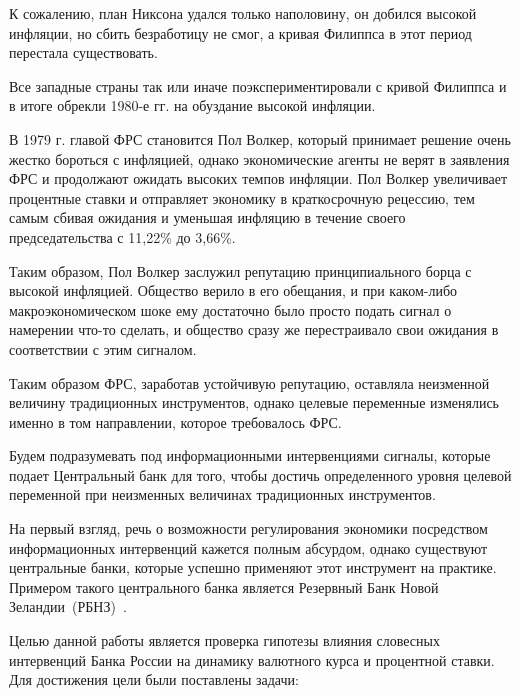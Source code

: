 \documentclass[14pt,a4paper, oneside]{extreport}
\begin{document}
К сожалению, план Никсона удался только наполовину, он добился высокой инфляции, но сбить безработицу не смог, а кривая Филиппса в этот период перестала существовать. 

Все западные страны так или иначе поэкспериментировали с кривой Филиппса и в итоге обрекли 1980-е гг. на обуздание высокой инфляции.

В 1979 г. главой ФРС становится Пол Волкер, который принимает решение очень жестко бороться с инфляцией, однако экономические агенты не верят в заявления ФРС и продолжают ожидать высоких темпов инфляции. Пол Волкер увеличивает процентные ставки и отправляет экономику в краткосрочную рецессию, тем самым сбивая ожидания и уменьшая инфляцию в течение своего председательства с 11,22\% до 3,66\%. 

Таким образом, Пол Волкер заслужил репутацию принципиального борца с высокой инфляцией. Общество верило в его обещания, и при каком-либо макроэкономическом шоке ему достаточно было просто подать сигнал о намерении что-то сделать, и общество сразу же перестраивало свои ожидания в соответствии с этим сигналом.

Таким образом ФРС, заработав устойчивую репутацию, оставляла неизменной величину традиционных инструментов, однако целевые переменные изменялись именно в том направлении, которое требовалось ФРС.

Будем подразумевать под информационными интервенциями сигналы, которые подает Центральный банк для того, чтобы достичь определенного уровня целевой переменной при неизменных величинах традиционных инструментов.

На первый взгляд, речь о возможности регулирования экономики посредством информационных интервенций кажется полным абсурдом, однако существуют центральные банки, которые успешно применяют этот инструмент на практике. Примером такого центрального банка является Резервный Банк Новой Зеландии~(РБНЗ)~\cite{guthrie2000open}.

Целью данной работы является проверка гипотезы влияния словесных интервенций Банка России на динамику валютного курса и процентной ставки. Для достижения цели были поставлены задачи: 
\end{document}

